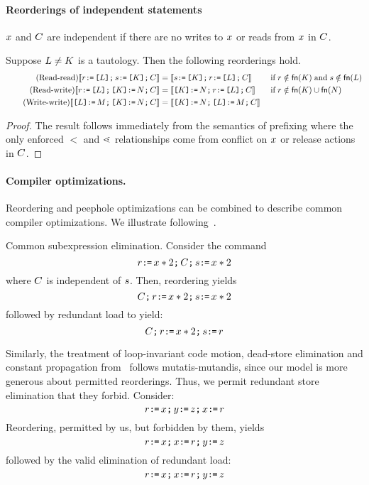 \paragraph*{Reorderings of independent statements}

$x$ and $C$ are independent if there are no writes to $x$ or reads from $x$ in $C$.  
\begin{lemma}%
  Suppose $L\neq K$ is a tautology.  Then the following reorderings hold.
  \begin{align*}
    \tag{Read-read}
    \llbracket r \texttt{:}\mkern-1mu\texttt{=}\, \texttt{[}L\texttt{]} \texttt{;}\, s \texttt{:}\mkern-1mu\texttt{=}\, \texttt{[}K\texttt{]} \texttt{;}\, C\rrbracket &=
    \llbracket s \texttt{:}\mkern-1mu\texttt{=}\, \texttt{[}K\texttt{]} \texttt{;}\, r \texttt{:}\mkern-1mu\texttt{=}\, \texttt{[}L\texttt{]} \texttt{;}\, C\rrbracket
    &&\;\allowbreak\text{if}\allowbreak\; r\notin\mathsf{fn}(K) \;\allowbreak\text{and}\allowbreak\; s\notin\mathsf{fn}(L)
    \\
    \tag{Read-write}
    \llbracket r \texttt{:}\mkern-1mu\texttt{=}\, \texttt{[}L\texttt{]} \texttt{;}\, \texttt{[}K\texttt{]} \texttt{:}\mkern-1mu\texttt{=}\, N \texttt{;}\, C\rrbracket &=
    \llbracket\texttt{[}K\texttt{]} \texttt{:}\mkern-1mu\texttt{=}\, N \texttt{;}\, r \texttt{:}\mkern-1mu\texttt{=}\, \texttt{[}L\texttt{]} \texttt{;}\, C\rrbracket
    &&\;\allowbreak\text{if}\allowbreak\; r\notin\mathsf{fn}(K) \cup\mathsf{fn}(N)
    \\
    \tag{Write-write}
    \llbracket\texttt{[}L\texttt{]} \texttt{:}\mkern-1mu\texttt{=}\, M \texttt{;}\, \texttt{[}K\texttt{]} \texttt{:}\mkern-1mu\texttt{=}\, N \texttt{;}\, C\rrbracket &=
    \llbracket\texttt{[}K\texttt{]} \texttt{:}\mkern-1mu\texttt{=}\, N \texttt{;}\, \texttt{[}L\texttt{]} \texttt{:}\mkern-1mu\texttt{=}\, M \texttt{;}\, C\rrbracket
  \end{align*}

\begin{proof}
  The result follows immediately from the semantics of prefixing where the
  only enforced $\lt$ and $\lessdot$ relationships come from conflict on $x$ or
  release actions in $C$.
\end{proof}
\end{lemma}

\paragraph*{Compiler optimizations.} Reordering and peephole optimizations can be combined to describe common  compiler optimizations.  We illustrate following~\citet{Dolan:2018:BDR:3192366.3192421}.

Common subexpression elimination. Consider the command 
\[ r \texttt{:}\mkern-1mu\texttt{=}\, x *2  \texttt{;}\, C \texttt{;}\, s \texttt{:}\mkern-1mu\texttt{=}\, x * 2 \]
where $C$ is independent of $s$.  Then, reordering yields
\[C \texttt{;}\, r \texttt{:}\mkern-1mu\texttt{=}\, x *2  \texttt{;}\,  s \texttt{:}\mkern-1mu\texttt{=}\, x * 2 \]
followed by redundant load to yield:
\[C \texttt{;}\, r \texttt{:}\mkern-1mu\texttt{=}\, x * 2 \texttt{;}\,  s \texttt{:}\mkern-1mu\texttt{=}\, r\]

Similarly, the treatment of loop-invariant code motion, dead-store elimination and constant propagation from~\citet{Dolan:2018:BDR:3192366.3192421} follows mutatis-mutandis, since our model is more generous about permitted reorderings.  Thus, we permit  redundant store elimination that they forbid.
Consider:
\[ r \texttt{:}\mkern-1mu\texttt{=}\, x \texttt{;}\, y \texttt{:}\mkern-1mu\texttt{=}\, z  \texttt{;}\, x \texttt{:}\mkern-1mu\texttt{=}\, r \]
Reordering, permitted by us, but forbidden by them, yields
\[ r \texttt{:}\mkern-1mu\texttt{=}\, x \texttt{;}\, x \texttt{:}\mkern-1mu\texttt{=}\, r \texttt{;}\, y \texttt{:}\mkern-1mu\texttt{=}\, z  \]
followed by the valid elimination of redundant load:
\[ r \texttt{:}\mkern-1mu\texttt{=}\, x \texttt{;}\, x \texttt{:}\mkern-1mu\texttt{=}\, r \texttt{;}\, y \texttt{:}\mkern-1mu\texttt{=}\, z  \]

